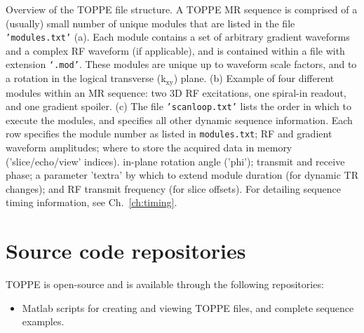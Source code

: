 {
Overview of the TOPPE file structure.
A TOPPE MR sequence is comprised of a (usually) small number of unique modules that are listed in the file \texttt{'modules.txt'} (a).
Each module contains a set of arbitrary gradient waveforms and a complex RF waveform (if applicable), and is contained within a file with extension \texttt{`.mod'}.
These modules are unique up to waveform scale factors, and to a rotation in the logical transverse (k$_\textrm{xy}$) plane.
(b) Example of four different modules within an MR sequence: two 3D RF excitations, one spiral-in readout, and one gradient spoiler.
(c) The file \texttt{'scanloop.txt'} lists the order in which to execute the modules, and specifies all other dynamic sequence information.
Each row specifies the module number as listed in \texttt{modules.txt}; RF and gradient waveform amplitudes;
where to store the acquired data in memory ('slice/echo/view' indices).
in-plane rotation angle ('phi');
transmit and receive phase;
a parameter 'textra' by which to extend module duration (for dynamic TR changes);
and RF transmit frequency (for slice offsets).
For detailing sequence timing information, see Ch.~\ref{ch:timing}.
}


\section{Source code repositories}

TOPPE is open-source and is available through the following repositories:


\begin{itemize}
\item Matlab scripts for creating and viewing TOPPE files, and complete sequence examples.
\end{itemize}


